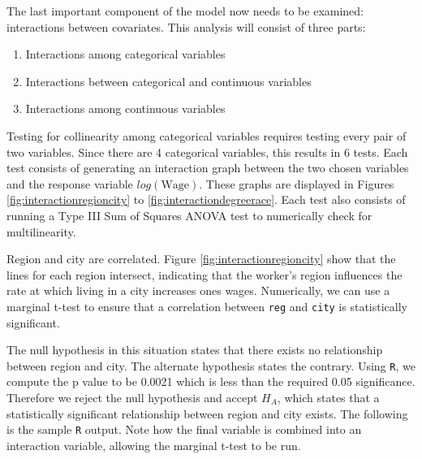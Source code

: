 \documentclass{article}
\begin{document}
      The last important component of the model now needs to be examined:
      interactions between covariates. This analysis will consist of three parts:
      \begin{enumerate}
        \item Interactions among categorical variables
        \item Interactions between categorical and continuous variables
        \item Interactions among continuous variables
      \end{enumerate}

      Testing for collinearity among categorical variables requires testing every
      pair of two variables. Since there are 4 categorical variables, this results
      in 6 tests. Each test consists of generating an interaction graph between the
      two chosen variables and the response variable $log(\text{Wage})$. These graphs
      are displayed in Figures \ref{fig:interactionregioncity} to
      \ref{fig:interactiondegreerace}. Each test also consists of running a
      Type III Sum of Squares ANOVA test to numerically check for multilinearity.

      Region and city are correlated. Figure \ref{fig:interactionregioncity} show
      that the lines for each region intersect, indicating that the worker's region
      influences the rate at which living in a city increases ones wages. Numerically,
      we can use a marginal t-test to ensure that a correlation between \texttt{reg}
      and \texttt{city} is statistically significant.

      The null hypothesis in this situation states that there exists no relationship
      between region and city. The alternate hypothesis states the contrary. Using
      \texttt{R}, we compute the p value to be 0.0021 which is less than the required
      0.05 significance. Therefore we reject the null hypothesis and accept $H_A$,
      which states that a statistically significant relationship between region and
      city exists. The following is the sample \texttt{R} output. Note how the
      final variable is combined into an interaction variable, allowing the marginal
      t-test to be run.
\end{document}
